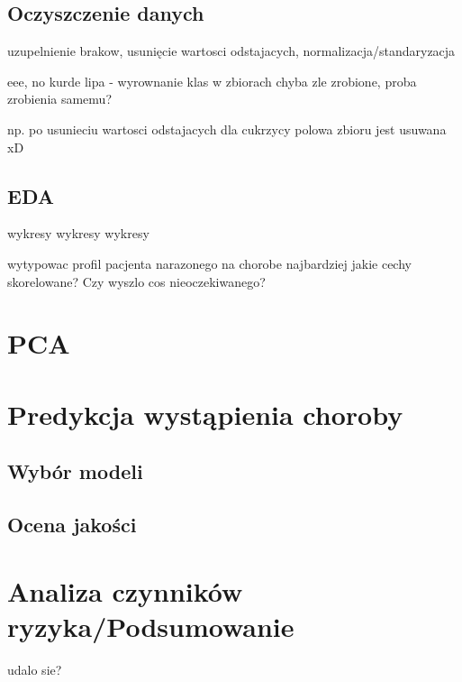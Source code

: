 \documentclass[onecolumn,12pt]{article}
\begin{document}
\subsection{Oczyszczenie danych}
uzupelnienie brakow, usunięcie wartosci odstajacych, normalizacja/standaryzacja

eee, no kurde lipa - wyrownanie klas w zbiorach chyba zle zrobione, proba zrobienia samemu?

np. po usunieciu wartosci odstajacych dla cukrzycy polowa zbioru jest usuwana xD

\subsection{EDA}
wykresy wykresy wykresy

wytypowac profil pacjenta narazonego na chorobe najbardziej
jakie cechy skorelowane? Czy wyszlo cos nieoczekiwanego?


\section{PCA}
\section{Predykcja wystąpienia choroby}
\subsection{Wybór modeli}
\subsection{Ocena jakości}
\section{Analiza czynników ryzyka/Podsumowanie}
udalo sie? 

\begin{thebibliography}{9}
\end{thebibliography}
\end{document}

